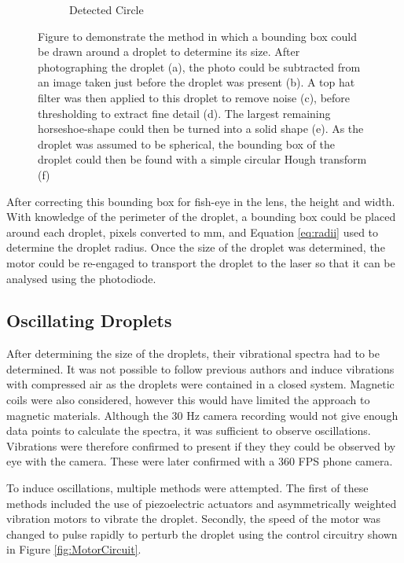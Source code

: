 \documentclass{physics_article_B}
\begin{document}
\begin{figure}[H]
\begin{subfigure}[b]{0.3\textwidth}
                        \caption{Detected Circle}
                        \label{fig:size:6}
                    \end{subfigure}
                    \caption{Figure to demonstrate the method in which a bounding box could be drawn around a droplet to determine its size. After photographing the droplet (a), the photo could be subtracted from an image taken just before the droplet was present (b). A top hat filter was then applied to this droplet to remove noise (c), before thresholding to extract fine detail (d). The largest remaining horseshoe-shape could then be turned into a solid shape (e). As the droplet was assumed to be spherical, the bounding box of the droplet could then be found with a simple circular Hough transform (f) }\label{fig:size}
                \end{figure}
            
            After correcting this bounding box for fish-eye in the lens, the height and width. With knowledge of the perimeter of the droplet, a bounding box could be placed around each droplet, pixels converted to mm, and Equation \ref{eq:radii} used to determine the droplet radius. Once the size of the droplet was determined, the motor could be re-engaged to transport the droplet to the laser so that it can be analysed using the photodiode.
    
    \subsection{Oscillating Droplets\label{sect:method:oscillating}}
        
        After determining the size of the droplets, their vibrational spectra had to be determined. It was not possible to follow previous authors and induce vibrations with compressed air as the droplets were contained in a closed system. Magnetic coils were also considered, however this would have limited the approach to magnetic materials. Although the 30 Hz camera recording would not give enough data points to calculate the spectra, it was sufficient to observe oscillations. Vibrations were therefore confirmed to present if they they could be observed by eye with the camera. These were later confirmed with a 360 FPS phone camera.
        
        To induce oscillations, multiple methods were attempted. The first of these methods included the use of piezoelectric actuators and asymmetrically weighted vibration motors to vibrate the droplet. Secondly, the speed of the motor was changed to pulse rapidly to perturb the droplet using the control circuitry shown in Figure \ref{fig:MotorCircuit}. 
        
\end{document}
